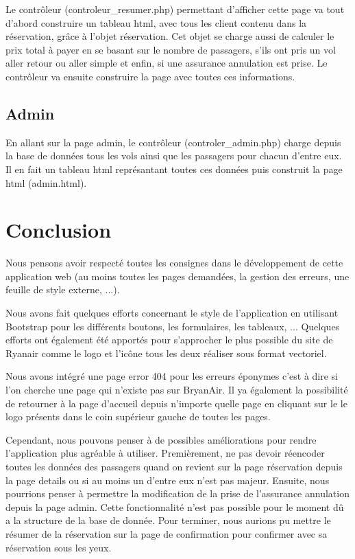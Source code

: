 \documentclass[12pt,a4paper]{article}
\begin{document}
			Le contrôleur (controleur\_resumer.php) permettant d'afficher cette page va tout d'abord construire un tableau html, avec tous les client contenu dans la réservation, grâce à l'objet réservation. Cet objet se charge aussi de calculer le prix total à payer en se basant sur le nombre de passagers, s'ils ont pris un vol aller retour ou aller simple et enfin, si une assurance annulation est prise. Le contrôleur va ensuite construire la page avec toutes ces informations.

		\subsection{Admin}
			En allant sur la page admin, le contrôleur (controler\_admin.php) charge depuis la base de données tous les vols ainsi que les passagers pour chacun d'entre eux. Il en fait un tableau html représantant toutes ces données puis construit la page html (admin.html).

	\section*{Conclusion}
			Nous pensons avoir respecté toutes les consignes dans le développement de cette application web (au moins toutes les pages demandées, la gestion des erreurs, une feuille de style externe, ...).

			Nous avons fait quelques efforts concernant le style de l'application en utilisant Bootstrap pour les différents boutons, les formulaires, les tableaux, ... Quelques efforts ont également été apportés pour s'approcher le plus possible du site de Ryanair comme le logo et l'icône tous les deux réaliser sous format vectoriel.

      Nous avons intégré une page error 404 pour les erreurs éponymes c'est à dire si l'on cherche une page qui n'existe pas sur BryanAir. Il ya également la possibilité de retourner à la page d'accueil depuis n'importe quelle page en cliquant sur le le logo présents dans le coin supérieur gauche de toutes les pages.

			Cependant, nous pouvons penser à de possibles améliorations pour rendre l'application plus agréable à utiliser. Premièrement, ne pas devoir réencoder toutes les données des passagers quand on revient sur la page réservation depuis la page details ou si au moins un d'entre eux n'est pas majeur. Ensuite, nous pourrions penser à permettre la modification de la prise de l'assurance annulation depuis la page admin. Cette fonctionnalité n'est pas possible pour le moment dû a la structure de la base de donnée. Pour terminer, nous aurions pu mettre le résumer de la réservation sur la page de confirmation pour confirmer avec sa réservation sous les yeux.
\end{document}

